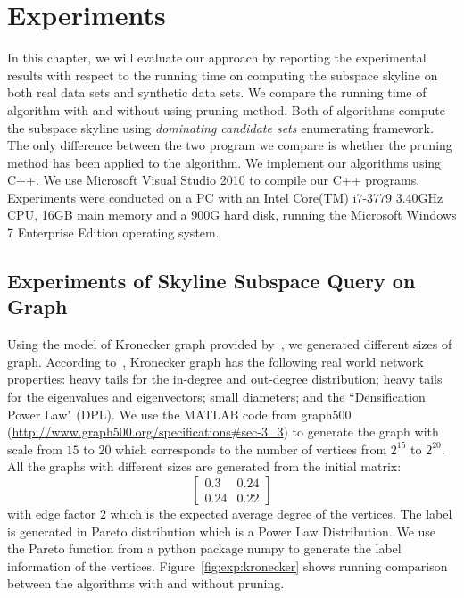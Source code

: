 
%
%

\chapter{Experiments}
\label{ch:exp}

In this chapter, we will evaluate our approach by reporting the experimental results with respect to the running time on computing the subspace skyline on both real data sets and synthetic data sets. We compare the running time of algorithm with and without using pruning method. Both of algorithms compute the subspace skyline using \emph{dominating candidate sets} enumerating framework. The only difference between the two program we compare is whether the pruning method has been applied to the algorithm.
We implement our algorithms using C++. We use Microsoft Visual Studio 2010 to compile our C++ programs. Experiments were conducted on a PC with an Intel Core(TM) i7-3779 3.40GHz CPU, 16GB main memory and a 900G hard disk, running the Microsoft Windows 7 Enterprise Edition operating system.

\section{Experiments of Skyline Subspace Query on Graph}

Using the model of Kronecker graph provided by~\cite{leskovec2005realistic}, we generated different sizes of graph.
According to~\cite{leskovec2005realistic}, Kronecker graph has the following real world network properties:
heavy tails for the in-degree and out-degree distribution;
heavy tails for the eigenvalues and eigenvectors;
small diameters; and the ``Densification Power Law" (DPL).
We use the MATLAB code from graph500 (\url{http://www.graph500.org/specifications#sec-3_3}) to generate the graph with scale from $15$ to $20$ which corresponds to the number of vertices from $2^{15}$ to $2^{20}$. All the graphs with different sizes are generated from the initial matrix:
\begin{equation}
\begin{bmatrix}
0.3 & 0.24\\ 
0.24 & 0.22
\end{bmatrix}
\end{equation}
with edge factor $2$ which is the expected average degree of the vertices. The label is generated in Pareto distribution which is a Power Law Distribution. We use the Pareto function from a python package numpy to generate the label information of the vertices. Figure~\ref{fig:exp:kronecker} shows running comparison between the algorithms with and without pruning.

